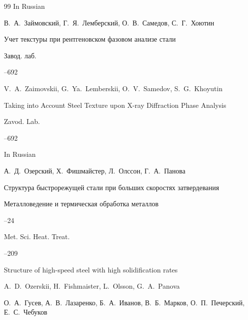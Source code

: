 \begin{thebibliography}{99}
\lang In Russian




\by В.~А.~Займовский, Г.~Я.~Лемберский, О.~В.~Самедов, С.~Г.~Хоютин

\paper Учет текстуры при рентгеновском фазовом анализе стали

\jour Завод. лаб.




--692

\misctransl

\by V.~A.~Zaimovskii, G.~Ya.~Lemberskii, O.~V.~Samedov, S.~G.~Khoyutin

\paper Taking into Account Steel Texture upon X-ray Diffraction Phase Analysis

\jour Zavod. Lab.



–692 


\lang In Russian




\by А.~Д.~Озерский, Х.~Фишмайстер, Л.~Олссон, Г.~А.~Панова

\paper Структура быстрорежущей стали при больших скоростях затвердевания

\jour Металловедение и термическая обработка металлов



--24

\transl

\jour Met. Sci. Heat. Treat.




--209

\paper Structure of high-speed steel with high solidification rates

\by A.~D.~Ozerskii, H.~Fishmaister, L.~Olsson, G.~A.~Panova 





\by О.~А.~Гусев, А.~В.~Лазаренко, Б.~А.~Иванов, В.~Б.~Марков, О.~П.~Печерский, Е.~С.~Чебуков


\end{thebibliography}
